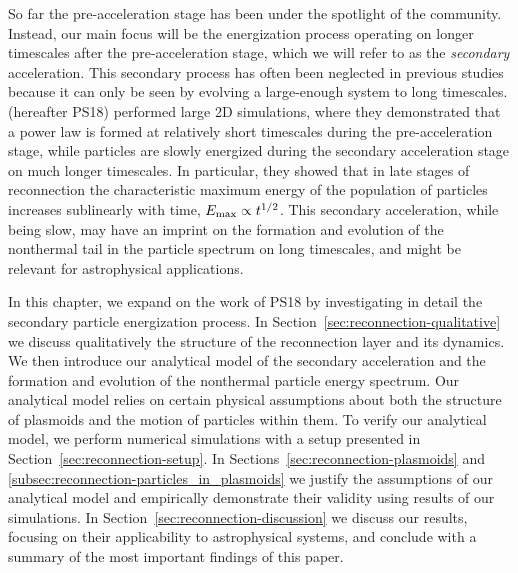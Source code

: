 So far the pre-acceleration stage has been under the spotlight of the community. Instead, our main focus will be the energization process operating on longer timescales after the pre-acceleration stage, which we will refer to as the {\it secondary} acceleration. This secondary process has often been neglected in previous studies because it can only be seen by evolving a large-enough system to long timescales. \citealt{2018MNRAS.481.5687P} (hereafter PS18) performed large 2D simulations, where they demonstrated that a power law is formed at relatively short timescales during the pre-acceleration stage, while particles are slowly energized during the secondary acceleration stage on much longer timescales. In particular, they showed that in late stages of reconnection the characteristic maximum energy of the population of particles increases sublinearly with time, $E_{\rm max} \propto t^{1/2}$. This secondary acceleration, while being slow, may have an imprint on the formation and evolution of the nonthermal tail in the particle spectrum on long timescales, and might be relevant for astrophysical applications. 

In this chapter, we expand on the work of PS18 by investigating in detail the secondary particle energization process. In Section~\ref{sec:reconnection-qualitative}  we discuss qualitatively the structure of the reconnection layer and its dynamics. We then introduce our analytical model of the secondary acceleration and the formation and evolution of the nonthermal particle energy spectrum. Our analytical model relies on certain physical assumptions about both the structure of plasmoids and the motion of particles within them. To verify our analytical model, we perform numerical simulations with a setup presented in Section~\ref{sec:reconnection-setup}. In Sections~\ref{sec:reconnection-plasmoids} and  \ref{subsec:reconnection-particles_in_plasmoids} we justify the assumptions of our analytical model and empirically demonstrate their validity using results of our simulations. In Section~\ref{sec:reconnection-discussion} we discuss our results, focusing on their applicability to astrophysical systems, and conclude with a summary of the most important findings of this paper.

